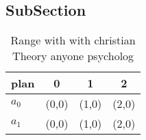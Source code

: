 \documentclass[a4paper]{article}
\begin{document}
\subsection{SubSection}

\begin{table}
\begin{adjustbox}{width=0.5\columnwidth}
\begin{tabular}{|l|l|l|l|}
\hline
\textbf{plan} & \multicolumn{1}{c|}{\textbf{0}} & \multicolumn{1}{c|}{\textbf{1}} & \multicolumn{1}{c|}{\textbf{2}} \\ \hline
\textbf{$a_0$}  & (0,0) & (1,0) & (2,0) \\ \hline
\textbf{$a_1$}  & (0,0) & (1,0) & (2,0) \\ \hline
\end{tabular}
\end{adjustbox}
\caption{Range with with christian Theory anyone psycholog
}
\end{table}
\end{document}
